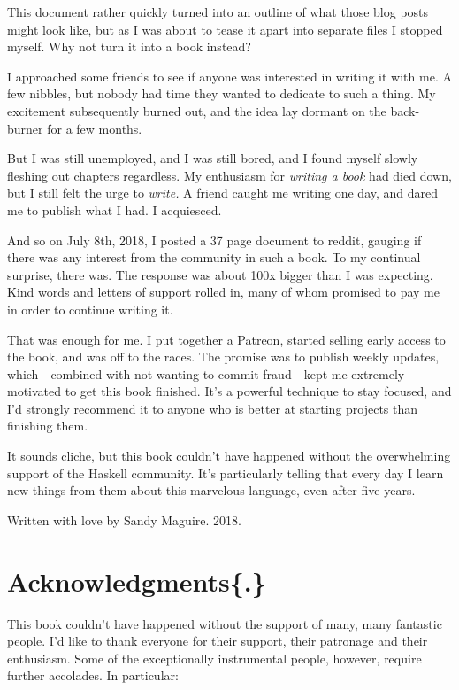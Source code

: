 \documentclass[
  11pt,
]{book}
\theoremstyle{nonumberplain}
\begin{document}
This document rather quickly turned into an outline of what those blog
posts might look like, but as I was about to tease it apart into
separate files I stopped myself. Why not turn it into a book instead?

I approached some friends to see if anyone was interested in writing it
with me. A few nibbles, but nobody had time they wanted to dedicate to
such a thing. My excitement subsequently burned out, and the idea lay
dormant on the back-burner for a few months.

But I was still unemployed, and I was still bored, and I found myself
slowly fleshing out chapters regardless. My enthusiasm for \emph{writing
a book} had died down, but I still felt the urge to \emph{write.} A
friend caught me writing one day, and dared me to publish what I had. I
acquiesced.

And so on July 8th, 2018, I posted a 37 page document to reddit, gauging
if there was any interest from the community in such a book. To my
continual surprise, there was. The response was about 100x bigger than I
was expecting. Kind words and letters of support rolled in, many of whom
promised to pay me in order to continue writing it.

That was enough for me. I put together a Patreon, started selling early
access to the book, and was off to the races. The promise was to publish
weekly updates, which---combined with not wanting to commit fraud---kept
me extremely motivated to get this book finished. It's a powerful
technique to stay focused, and I'd strongly recommend it to anyone who
is better at starting projects than finishing them.

It sounds cliche, but this book couldn't have happened without the
overwhelming support of the Haskell community. It's particularly telling
that every day I learn new things from them about this marvelous
language, even after five years.

Written with love by Sandy Maguire. 2018.

\hypertarget{acknowledgments.}{%
\chapter{Acknowledgments\{.\}}\label{acknowledgments.}}

This book couldn't have happened without the support of many, many
fantastic people. I'd like to thank everyone for their support, their
patronage and their enthusiasm. Some of the exceptionally instrumental
people, however, require further accolades. In particular:
\end{document}
